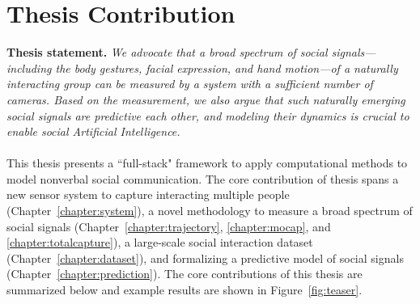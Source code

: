 \section{Thesis Contribution}

\noindent \textbf{Thesis statement.}
	\emph{We advocate that a broad spectrum of social signals---including the body gestures, facial expression, and hand motion---of a naturally interacting group can be measured by a system with a sufficient number of cameras. Based on the measurement, we also argue that such naturally emerging social signals are predictive each other, and modeling their dynamics is crucial to enable social Artificial Intelligence.}\\
\mbox{ }\\
\indent This thesis presents a ``full-stack" framework to apply computational methods to model nonverbal social communication. The core contribution of thesis spans a new sensor system to capture interacting multiple people (Chapter~\ref{chapter:system}), a novel methodology to measure a broad spectrum of social signals (Chapter~\ref{chapter:trajectory}, \ref{chapter:mocap}, and  \ref{chapter:totalcapture}), a large-scale social interaction dataset (Chapter~\ref{chapter:dataset}), and formalizing a predictive model of social signals (Chapter~\ref{chapter:prediction}). The core contributions of this thesis are summarized below and example results are shown in Figure~\ref{fig:teaser}.
%
%
%
%
%


